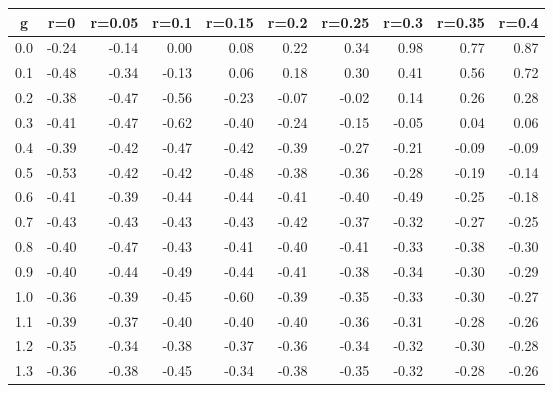 %
\begin{table}[!tbp]
 \begin{center}
 \begin{tabular}{rrrrrrrrrr}\hline\hline
\multicolumn{1}{c}{g}&\multicolumn{1}{c}{r=0}&\multicolumn{1}{c}{r=0.05}&\multicolumn{1}{c}{r=0.1}&\multicolumn{1}{c}{r=0.15}&\multicolumn{1}{c}{r=0.2}&\multicolumn{1}{c}{r=0.25}&\multicolumn{1}{c}{r=0.3}&\multicolumn{1}{c}{r=0.35}&\multicolumn{1}{c}{r=0.4}\tabularnewline
\hline
0.0&-0.24&-0.14& 0.00& 0.08& 0.22& 0.34& 0.98& 0.77& 0.87\tabularnewline
0.1&-0.48&-0.34&-0.13& 0.06& 0.18& 0.30& 0.41& 0.56& 0.72\tabularnewline
0.2&-0.38&-0.47&-0.56&-0.23&-0.07&-0.02& 0.14& 0.26& 0.28\tabularnewline
0.3&-0.41&-0.47&-0.62&-0.40&-0.24&-0.15&-0.05& 0.04& 0.06\tabularnewline
0.4&-0.39&-0.42&-0.47&-0.42&-0.39&-0.27&-0.21&-0.09&-0.09\tabularnewline
0.5&-0.53&-0.42&-0.42&-0.48&-0.38&-0.36&-0.28&-0.19&-0.14\tabularnewline
0.6&-0.41&-0.39&-0.44&-0.44&-0.41&-0.40&-0.49&-0.25&-0.18\tabularnewline
0.7&-0.43&-0.43&-0.43&-0.43&-0.42&-0.37&-0.32&-0.27&-0.25\tabularnewline
0.8&-0.40&-0.47&-0.43&-0.41&-0.40&-0.41&-0.33&-0.38&-0.30\tabularnewline
0.9&-0.40&-0.44&-0.49&-0.44&-0.41&-0.38&-0.34&-0.30&-0.29\tabularnewline
1.0&-0.36&-0.39&-0.45&-0.60&-0.39&-0.35&-0.33&-0.30&-0.27\tabularnewline
1.1&-0.39&-0.37&-0.40&-0.40&-0.40&-0.36&-0.31&-0.28&-0.26\tabularnewline
1.2&-0.35&-0.34&-0.38&-0.37&-0.36&-0.34&-0.32&-0.30&-0.28\tabularnewline
1.3&-0.36&-0.38&-0.45&-0.34&-0.38&-0.35&-0.32&-0.28&-0.26\tabularnewline
\hline
\end{tabular}

\end{center}

\end{table}

